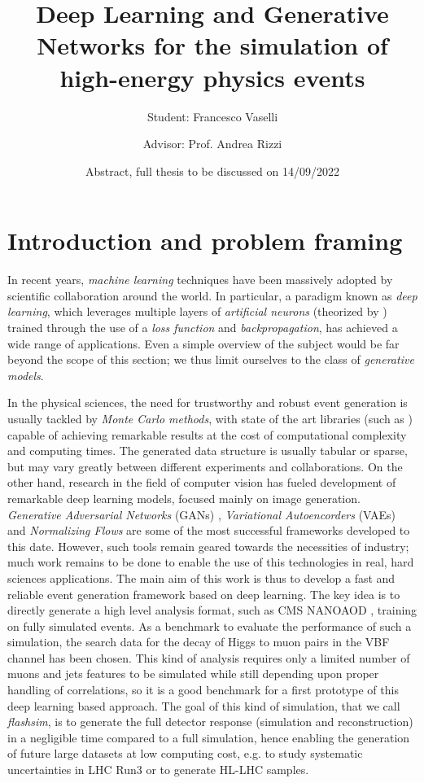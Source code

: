 \documentclass{scrartcl} %
\title{Deep Learning and Generative Networks for the simulation of high-energy physics events}
\author{Student: Francesco Vaselli \and
	Advisor: Prof. Andrea Rizzi}
\date{Abstract, full thesis to be discussed on 14/09/2022}
\newcommand{\quickcharcount}[1]{%
	\immediate\write18{texcount -1 -sum -merge -char #1.tex > #1-chars.sum}%
	\openin\tmp=#1-chars.sum%
	\read\tmp to \thechar%
	\closein\tmp%
}
\newcommand{\quickwordcount}[1]{%
	\immediate\write18{texcount -1 -sum -merge #1.tex > #1-words.sum}%
	\openin\tmp=#1-words.sum%
	\read\tmp to \theword%
	\closein\tmp%
}
\begin{document}
	\maketitle
	
	
	\section*{Introduction and problem framing}
	In recent years, \emph{machine learning} techniques have been massively adopted by scientific collaboration around the world. In particular, a paradigm known as \emph{deep learning}, which leverages multiple layers of \emph{artificial neurons} (theorized by \cite{Rosenblatt1958ThePA}) trained through the use of a \emph{loss function} and \emph{backpropagation}, has achieved a wide range of applications. Even a simple overview of the subject would be far beyond the scope of this section; we thus limit ourselves to the class of \emph{generative models}.
	
	In the physical sciences, the need for trustworthy and robust event generation is usually tackled by \emph{Monte Carlo methods}, with state of the art libraries (such as \cite{AGOSTINELLI2003250}) capable of achieving remarkable results at the cost of computational complexity and computing times. The generated data structure is usually tabular or sparse, but may vary greatly between different experiments and collaborations. On the other hand, research in the field of computer vision has fueled development of remarkable deep learning models, focused mainly on image generation. \emph{Generative Adversarial Networks} (GANs) \cite{goodfellow2014generative}, \emph{Variational Autoencorders} (VAEs) \cite{kingma2014autoencoding} and \emph{Normalizing Flows} \cite{rezende2016variational} are some of the most successful frameworks developed to this date. However, such tools remain geared towards the necessities of industry; much work remains to be done to enable the use of this technologies in real, hard sciences applications.
	The main aim of this work is thus to develop a fast and reliable event generation framework based on deep learning. The key idea is to directly generate a high level analysis format, such as CMS NANOAOD \cite{2019EPJWC.21406021R}, training on fully simulated events. As a benchmark to evaluate the performance of such a simulation, the search data for the decay of Higgs to muon pairs in the VBF channel has been chosen. This kind of analysis requires only a limited number of muons and jets features to be simulated while still depending upon proper handling of correlations, so it is a good benchmark for a first prototype of this deep learning based approach. The goal of this kind of simulation, that we call \emph{flashsim}, is to generate the full detector response (simulation and reconstruction) in a negligible time compared to a full simulation, hence enabling the generation of future large datasets at low computing cost, e.g. to study systematic uncertainties in LHC Run3 or to generate HL-LHC samples. 
	
\end{document}
